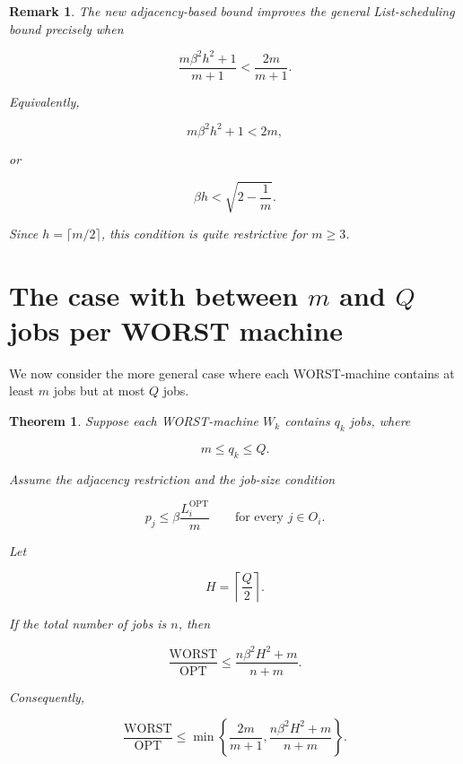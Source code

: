 \documentclass[11pt]{article}
\newtheorem{theorem}{Theorem}
\newtheorem{remark}{Remark}
\newcommand{\OPT}{\mathrm{OPT}}
\newcommand{\WORST}{\mathrm{WORST}}
\begin{document}
\begin{remark}
The new adjacency-based bound improves the general List-scheduling bound precisely when

\[
\frac{m\beta^2 h^2+1}{m+1}
<
\frac{2m}{m+1}.
\]

Equivalently,

\[
m\beta^2h^2+1<2m,
\]

or

\[
\beta h < \sqrt{2-\frac1m}.
\]

Since \(h=\lceil m/2\rceil\), this condition is quite restrictive for \(m\ge 3\).
\end{remark}

\section{The case with between \(m\) and \(Q\) jobs per WORST machine}

We now consider the more general case where each WORST-machine contains at least \(m\)
jobs but at most \(Q\) jobs.

\begin{theorem}
Suppose each WORST-machine \(W_k\) contains \(q_k\) jobs, where

\[
m\le q_k\le Q.
\]

Assume the adjacency restriction and the job-size condition

\[
p_j\le \beta \frac{L_i^{\OPT}}{m}
\qquad
\text{for every } j\in O_i.
\]

Let

\[
H=\left\lceil \frac Q2\right\rceil .
\]

If the total number of jobs is \(n\), then

\[
\frac{\WORST}{\OPT}
\le
\frac{n\beta^2H^2+m}{n+m}.
\]

Consequently,

\[
\frac{\WORST}{\OPT}
\le
\min\left\{
\frac{2m}{m+1},
\frac{n\beta^2H^2+m}{n+m}
\right\}.
\]
\end{theorem}
\end{document}
